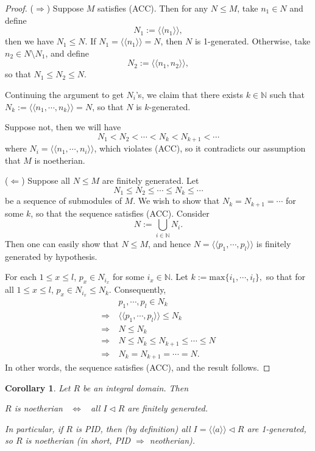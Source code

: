 \documentclass[11pt,openany]{book}
\theoremstyle{plain}
\newtheorem{corollary}[corollary]{Corollary}
\theoremstyle{definition}
\theoremstyle{remark}
\begin{document}
\begin{proof}
    ($\Rightarrow$) Suppose $M$ satisfies (ACC). Then for any $N\leq M$, take $n_1\in N$ and define
    $$N_1:=\langle\langle n_1\rangle\rangle,$$
    then we have $N_1\leq N$. If $N_1=\langle\langle n_1\rangle\rangle=N$, then $N$ is 1-generated. Otherwise, take $n_2\in N\setminus N_1$, and define
    $$N_2:=\langle\langle n_1,n_2\rangle\rangle,$$
    so that $N_1\leq N_2\leq N$.

    Continuing the argument to get $N_{i}$'s, we claim that there exists $k\in \mathbb{N}$ such that $N_k:=\langle\langle n_1,\cdots,n_k\rangle\rangle=N$, so that $N$ is $k$-generated.

    Suppose not, then we will have 
    $$N_1<N_2<\cdots<N_k<N_{k+1}<\cdots$$
    where $N_i=\langle\langle n_1,\cdots,n_i\rangle\rangle$, which violates (ACC), so it contradicts our assumption that $M$ is noetherian.

    \medskip
    ($\Leftarrow$) Suppose all $N\leq M$ are finitely generated. Let 
    $$N_1\leq N_2\leq\cdots\leq N_k\leq\cdots$$
    be a sequence of submodules of $M$. We wish to show that  $N_k=N_{k+1}=\cdots$ for some $k$, so that the sequence satisfies (ACC). Consider
    $$N:=\bigcup_{i\in\mathbb{N}}N_i.$$
    Then one can easily show that $N\leq M$, and hence $N=\langle\langle p_1,\cdots,p_l\rangle\rangle$ is finitely generated by hypothesis.

    For each $1\leq x\leq l$, $p_x\in N_{i_x}$ for some $i_x\in\mathbb{N}$. Let $k:=\mathrm{max}\{i_1,\cdots,i_l\},$
    so that for all $1 \leq x \leq l$, $p_x \in N_{i_x} \leq N_k$. Consequently,
    \begin{align*}
            &p_1,\cdots,p_l \in N_k  \\  
        \Rightarrow\ &\langle\langle p_1,\cdots,p_l \rangle\rangle\leq N_k\\
        \Rightarrow\ &N\leq N_k\\
        \Rightarrow\ &N\leq N_k\leq N_{k+1}\leq\cdots\leq N\\
        \Rightarrow\ &N_k=N_{k+1}=\cdots=N.
    \end{align*}
    In other words, the sequence satisfies (ACC), and the result follows.
\end{proof}

\begin{corollary} \label{fgforideals}
Let $R$ be an integral domain. Then
\begin{center}
    $R$ is noetherian \ $\Leftrightarrow$ \ all $I\lhd R$ are finitely generated.
\end{center}
    In particular, if $R$ is PID, then (by definition) all $I=\langle\langle a\rangle\rangle\lhd R$ are 1-generated, so $R$ is noetherian (in short, PID $\Rightarrow$ neotherian).
\end{corollary}
\end{document}
